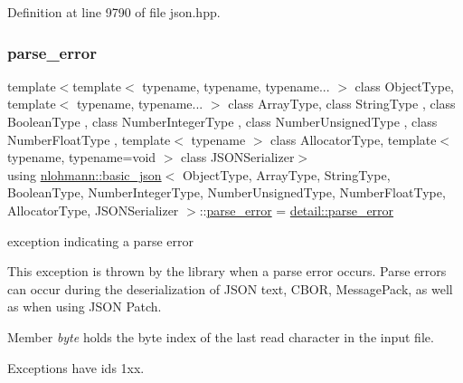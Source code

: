 Definition at line 9790 of file json.\+hpp.

\mbox{\label{classnlohmann_1_1basic__json_af1efc2468e6022be6e35fc2944cabe4d}} 
\subsubsection{\texorpdfstring{parse\+\_\+error}{parse\_error}}
{\footnotesize\ttfamily template$<$template$<$ typename, typename, typename... $>$ class Object\+Type, template$<$ typename, typename... $>$ class Array\+Type, class String\+Type , class Boolean\+Type , class Number\+Integer\+Type , class Number\+Unsigned\+Type , class Number\+Float\+Type , template$<$ typename $>$ class Allocator\+Type, template$<$ typename, typename=void $>$ class J\+S\+O\+N\+Serializer$>$ \\
using \hyperlink{classnlohmann_1_1basic__json}{nlohmann\+::basic\+\_\+json}$<$ Object\+Type, Array\+Type, String\+Type, Boolean\+Type, Number\+Integer\+Type, Number\+Unsigned\+Type, Number\+Float\+Type, Allocator\+Type, J\+S\+O\+N\+Serializer $>$\+::\hyperlink{classnlohmann_1_1basic__json_af1efc2468e6022be6e35fc2944cabe4d}{parse\+\_\+error} =  \hyperlink{classnlohmann_1_1detail_1_1parse__error}{detail\+::parse\+\_\+error}}



exception indicating a parse error 

This exception is thrown by the library when a parse error occurs. Parse errors can occur during the deserialization of J\+S\+ON text, C\+B\+OR, Message\+Pack, as well as when using J\+S\+ON Patch.

Member {\itshape byte} holds the byte index of the last read character in the input file.

Exceptions have ids 1xx.

